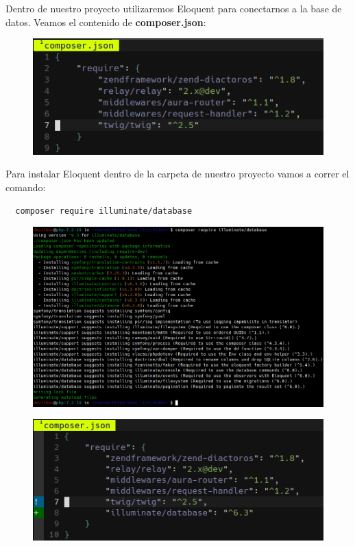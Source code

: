 \documentclass{article}
\begin{document}
Dentro de nuestro proyecto utilizaremos Eloquent para conectarnos a la base de
datos. Veamos el contenido de \textbf{composer.json}:

\begin{figure}[h!]
  \centering
  \includegraphics[scale=0.75]{./Pictures/102_composerjson.png}
\end{figure}

Para instalar Eloquent dentro de la carpeta de nuestro proyecto vamos a correr el
comando:\\

\begin{verbatim}
  composer require illuminate/database
\end{verbatim}

\begin{figure}[h!]
  \centering
  \includegraphics[scale=0.75]{./Pictures/103_eloquent_composer.png}
\end{figure}

\newpage

\begin{figure}[h!]
  \centering
  \includegraphics[scale=0.75]{./Pictures/104_composerjson.png}
\end{figure}
\end{document}
